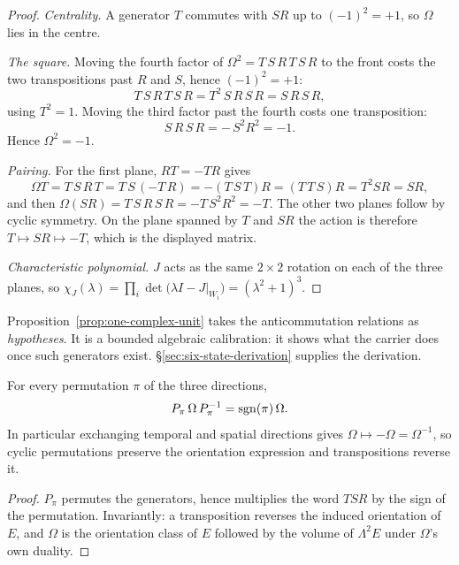 \begin{proof}
\emph{Centrality.}  A generator $T$ commutes with $SR$ up to $(-1)^{2}=+1$, so
$\Omega$ lies in the centre.

\emph{The square.}  Moving the fourth factor of $\Omega^{2}=T\,S\,R\,T\,S\,R$ to the
front costs the two transpositions past $R$ and $S$, hence $(-1)^{2}=+1$:
\[
  T\,S\,R\,T\,S\,R = T^{2}\,S\,R\,S\,R = S\,R\,S\,R ,
\]
using $T^{2}=1$.  Moving the third factor past the fourth costs one transposition:
\[
  S\,R\,S\,R = -\,S^{2}R^{2} = -1 .
\]
Hence $\Omega^{2}=-1$.

\emph{Pairing.}  For the first plane, $RT=-TR$ gives
\[
  \Omega T=T\,S\,R\,T=T\,S\,(-T\,R)=-(T\,S\,T)R=(T\,T\,S)R=T^{2}SR=SR,
\]
and then $\Omega(SR)=T\,S\,R\,S\,R=-T\,S^{2}R^{2}=-T$.  The other two planes follow by
cyclic symmetry.  On the plane spanned by $T$ and $SR$ the action is therefore
$T\mapsto SR\mapsto -T$, which is the displayed matrix.

\emph{Characteristic polynomial.}  $J$ acts as the same $2\times2$ rotation on each of
the three planes, so
$\chi_J(\lambda)=\prod_{i}\det\bigl(\lambda I-J|_{W_i}\bigr)=(\lambda^{2}+1)^{3}$.
\end{proof}

\begin{calibration}\label{cal:algebraic-form}
Proposition~\ref{prop:one-complex-unit} takes the anticommutation relations as
\emph{hypotheses}.  It is a bounded algebraic calibration: it shows what the carrier
does once such generators exist.  \S\ref{sec:six-state-derivation} supplies the
derivation.
\end{calibration}

\begin{proposition}\label{prop:sign-law}
For every permutation $\pi$ of the three directions,
\[
  P_\pi\,\Omega\,P_\pi^{-1}=\operatorname{sgn}(\pi)\,\Omega .
\]
In particular exchanging temporal and spatial directions gives
$\Omega\mapsto-\Omega=\Omega^{-1}$, so cyclic permutations preserve the orientation
expression and transpositions reverse it.
\end{proposition}

\begin{proof}
$P_\pi$ permutes the generators, hence multiplies the word $TSR$ by the sign of the
permutation.  Invariantly: a transposition reverses the induced orientation of $E$,
and $\Omega$ is the orientation class of $E$ followed by the volume of
$\Lambda^{2}E$ under $\Omega$'s own duality.
\end{proof}

